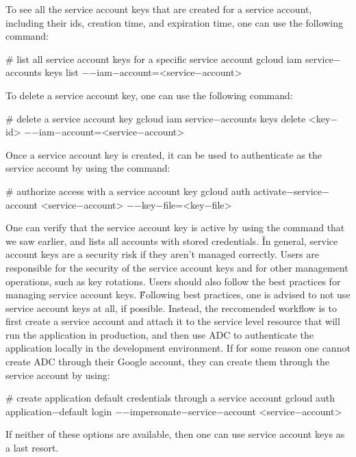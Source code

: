To see all the service account keys that are created for a service account, including their ids, creation time, and
expiration time, one can use the following command:
\begin{bash}
# list all service account keys for a specific service account
gcloud iam service$-$accounts keys list $-$$-$iam$-$account=<service$-$account>
\end{bash}

To delete a service account key, one can use the following command:
\begin{bash}
# delete a service account key
gcloud iam service$-$accounts keys delete <key$-$id> $-$$-$iam$-$account=<service$-$account>
\end{bash}

Once a service account key is created, it can be used to authenticate as the service account by using the command:
\begin{bash}
# authorize access with a service account key
gcloud auth activate$-$service$-$account <service$-$account> $-$$-$key$-$file=<key$-$file>
\end{bash}

One can verify that the service account key is active by using the  command that we saw earlier,
and lists all accounts with stored credentials. \v

In general, service account keys are a security risk if they aren't managed correctly. Users are responsible for the
security of the service account keys and for other management operations, such as key rotations. Users should also
follow the best practices for managing service account keys. \v

Following best practices, one is advised to not use service account keys at all, if possible. Instead, the reccomended
workflow is to first create a service account and attach it to the service level resource that will run the application
in production, and then use ADC to authenticate the application locally in the development environment. If for some
reason one cannot create ADC through their Google account, they can create them through the service account by using:
\begin{bash}
# create application default credentials through a service account
gcloud auth application$-$default login $-$$-$impersonate$-$service$-$account <service$-$account>
\end{bash}

If neither of these options are available, then one can use service account keys as a last resort.

